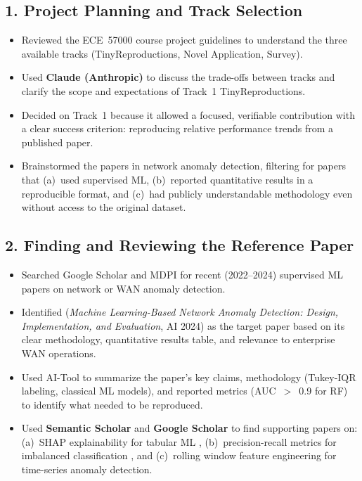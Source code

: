 \documentclass{article}
\begin{document}
\subsection*{1. Project Planning and Track Selection}
\begin{itemize}
  \item Reviewed the ECE~57000 course project guidelines to understand the three
        available tracks (TinyReproductions, Novel Application, Survey).
  \item Used \textbf{Claude (Anthropic)} to discuss the trade-offs between tracks
        and clarify the scope and expectations of Track~1 TinyReproductions.
  \item Decided on Track~1 because it allowed a focused, verifiable contribution
        with a clear success criterion: reproducing relative performance trends
        from a published paper.
  \item Brainstormed the papers in network anomaly detection,
        filtering for papers that (a)~used supervised ML, (b)~reported quantitative
        results in a reproducible format, and (c)~had publicly understandable
        methodology even without access to the original dataset.
\end{itemize}

\subsection*{2. Finding and Reviewing the Reference Paper}
\begin{itemize}
  \item Searched Google Scholar and MDPI for recent (2022--2024) supervised ML
        papers on network or WAN anomaly detection.
  \item Identified \citet{schummer2024} (\textit{Machine Learning-Based Network
        Anomaly Detection: Design, Implementation, and Evaluation}, AI 2024) as
        the target paper based on its clear methodology, quantitative results
        table, and relevance to enterprise WAN operations.
  \item Used AI-Tool to summarize the paper's key claims, methodology (Tukey-IQR
        labeling, classical ML models), and reported metrics (AUC~$>$~0.9 for RF)
        to identify what needed to be reproduced.
  \item Used \textbf{Semantic Scholar} and \textbf{Google Scholar} to find
        supporting papers on: (a)~SHAP explainability for tabular ML
        \citep{lundberg2017}, (b)~precision-recall metrics for imbalanced
        classification \citep{davis2006}, and (c)~rolling window
        feature engineering for time-series anomaly detection.
\end{itemize}
\end{document}

